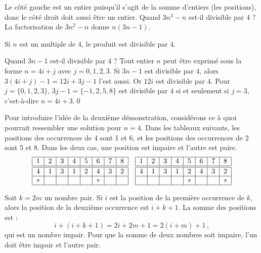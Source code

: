 Le côté gauche est un entier puisqu'il s'agit de la somme d'entiers (les positions), donc le côté droit doit aussi être un entier. Quand $3n^3-n$ est-il divisible par $4$ ? La factorisation de $3n^2-n$ donne $n(3n-1)$.

Si $n$ est un multiple de $4$, le produit est divisible par $4$.

Quand $3n-1$ est-il divisible par $4$ ? Tout entier $n$ peut être exprimé sous la forme  $n=4i+j$ avec $j=0,1,2,3$. Si $3n-1$ est divisible par $4$, alors $3(4i+j)-1 = 12i+3j-1$ l'est aussi. Or $12i$ est divisible par $4$. Pour $j=\{0,1,2,3\}$, $3j-1=\{-1,2,5,8\}$ est divisible par $4$ si et seulement si $j=3$, c'est-à-dire $n=4i+3$.\qed

\medskip

Pour introduire l'idée de la deuxième démonstration, considérons ce à quoi pourrait ressembler une solution pour $n=4$. Dans les tableaux suivants, les positions des occurrences de 4 sont 1 et 6, et les positions des occurrences de 2 sont 5 et 8. Dans les deux cas, une position est impaire et l'autre est paire. 
\[
\addtolength{\arraycolsep}{1pt}
\begin{array}{|c|c|c|c|c|c|c|c|}
\hline
1&2&3&4&5&6&7&8\\
\hline\hline
4&1&3&1&2&4&3&2\\\hline
*&&&&&*&&\\\hline
\end{array}
\hspace{1em}
\begin{array}{|c|c|c|c|c|c|c|c|}
\hline
1&2&3&4&5&6&7&8\\
\hline\hline
4&1&3&1&2&4&3&2\\\hline
&&&&*&&&*\\\hline
\end{array}
\]

Soit $k=2m$ un nombre pair. Si $i$ est la position de la première occurrence de $k$, alors la position de la deuxième occurrence est $i+k+1$.
La somme des positions est :
\[
i+(i+k+1)=2i+2m+1=2(i+m)+1\,,
\]
qui est un nombre impair. Pour que la somme de deux nombres soit impaire, l'un doit être impair et l'autre pair.

